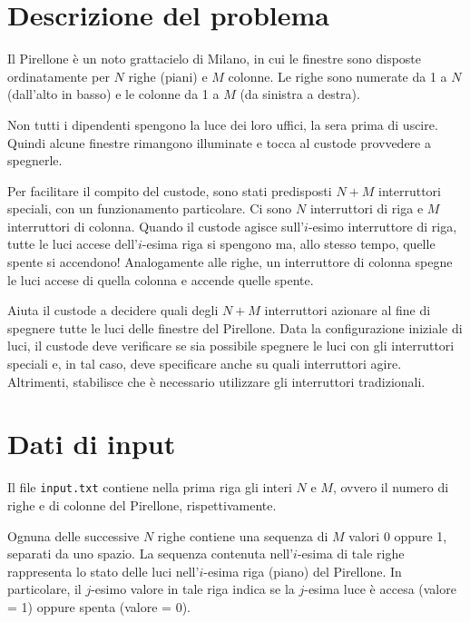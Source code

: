 \documentclass[a4paper,11pt]{article}
\begin{document}
\vspace{0.5cm}



\vspace{0.5cm}

\section*{Descrizione del problema}
  
Il Pirellone è un noto grattacielo di Milano, in cui le
finestre sono disposte ordinatamente per $N$ righe (piani) e
$M$ colonne. Le righe sono numerate da 1 a $N$
(dall'alto in basso) e le colonne da 1 a $M$ (da sinistra a
destra).

Non tutti i dipendenti spengono la luce dei loro uffici, la sera prima
di uscire. Quindi alcune finestre rimangono illuminate e tocca al
custode provvedere a spegnerle.

Per facilitare il compito del custode, sono stati predisposti
$N+M$ interruttori speciali, con un funzionamento
particolare.  Ci sono $N$ interruttori di riga e $M$
interruttori di colonna.  Quando il custode agisce
sull'$i$-esimo interruttore di riga, tutte le luci accese
dell'$i$-esima riga si spengono ma, allo stesso tempo, quelle
spente si accendono! Analogamente alle righe, un interruttore di
colonna spegne le luci accese di quella colonna e accende quelle
spente.

Aiuta il custode a decidere quali degli $N+M$
interruttori azionare al fine di spegnere tutte le luci delle finestre
del Pirellone. Data la configurazione iniziale di luci, il custode
deve verificare se sia possibile spegnere le luci con gli interruttori
speciali e, in tal caso, deve specificare anche su quali interruttori
agire. Altrimenti, stabilisce che è necessario utilizzare gli
interruttori tradizionali.


\section*{Dati di input}
  
Il file \texttt{input.txt} contiene nella prima riga gli interi
$N$ e $M$, ovvero il numero di righe e di colonne
del Pirellone, rispettivamente.

Ognuna delle successive $N$ righe contiene una sequenza di
$M$ valori 0 oppure 1, separati da uno spazio.  La sequenza
contenuta nell'$i$-esima di tale righe rappresenta lo stato
delle luci nell'$i$-esima riga (piano) del Pirellone. In
particolare, il $j$-esimo valore in tale riga indica se la
$j$-esima luce è accesa (valore = 1) oppure spenta
(valore = 0).
\end{document}
